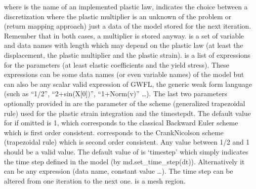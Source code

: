 \documentclass[a4paper,11pt,english]{sphinxmanual}
\begin{document}
where  is the name of an implemented plastic law, 
indicates the choice between a discretization where the plastic multiplier
is an unknown of the problem or (return mapping approach) just a data of
the model stored for the next iteration. Remember that in both cases, a
multiplier is stored anyway.  is a set of variable and data
names with length which may depend on the plastic law (at least the
displacement, the plastic multiplier and the plastic strain).
 is a list of expressions for the parameters (at least elastic
coefficients and the yield stress). These expressions can be some data
names (or even variable names) of the model but can also be any scalar
valid expression of GWFL, the generic weak form language (such as “1/2”,
“2+sin(X{[}0{]})”, “1+Norm(v)” …). The last two parameters optionally
provided in  are the  parameter of the \sphinxhyphen{}scheme
(generalized trapezoidal rule) used for the plastic strain integration
and the time\sphinxhyphen{}step\textasciigrave{}dt\textasciigrave{}. The default value for  if omitted is 1,
which corresponds to the classical Backward Euler scheme which is first
order consistent.  corresponds to the Crank\sphinxhyphen{}Nicolson scheme
(trapezoidal rule) which is second order consistent. Any value
between 1/2 and 1 should be a valid value. The default value of  is
‘timestep’ which simply indicates the time step defined in the model
(by md.set\_time\_step(dt)). Alternatively it can be any expression
(data name, constant value …). The time step can be altered from one
iteration to the next one.  is a mesh region.
\end{document}
